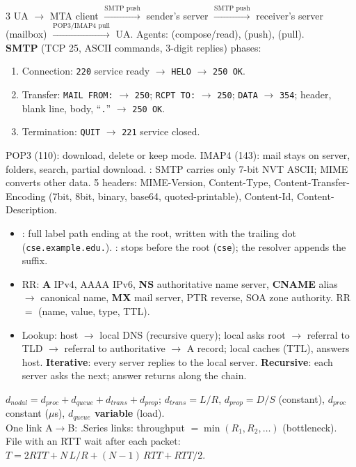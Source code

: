 \begin{multicols*}{3}
 
UA $\to$ MTA client $\xrightarrow{\text{SMTP push}}$ sender's server $\xrightarrow{\text{SMTP push}}$ receiver's server (mailbox) $\xrightarrow{\text{POP3/IMAP4 pull}}$ UA. Agents:  (compose/read),  (push),  (pull).\\
\textbf{SMTP} (TCP 25, ASCII commands, 3-digit replies) phases:
\begin{enumerate}
  \item Connection: \texttt{220} service ready $\to$ \texttt{HELO} $\to$ \texttt{250 OK}.
  \item Transfer: \texttt{MAIL FROM:} $\to$ \texttt{250}; \texttt{RCPT TO:} $\to$ \texttt{250}; \texttt{DATA} $\to$ \texttt{354}; header, blank line, body, ``\texttt{.}'' $\to$ \texttt{250 OK}.
  \item Termination: \texttt{QUIT} $\to$ \texttt{221} service closed.
\end{enumerate}
POP3 (110): download, delete or keep mode. IMAP4 (143): mail stays on server, folders, search, partial download.
: SMTP carries only 7-bit NVT ASCII; MIME converts other data. 5 headers: MIME-Version, Content-Type, Content-Transfer-Encoding (7bit, 8bit, binary, base64, quoted-printable), Content-Id, Content-Description.

 
\begin{itemize}
  \item {}: full label path ending at the root, written with the trailing dot (\texttt{cse.example.edu.}). : stops before the root (\texttt{cse}); the resolver appends the suffix.
  \item RR: \textbf{A} IPv4, AAAA IPv6, \textbf{NS} authoritative name server, \textbf{CNAME} alias $\to$ canonical name, \textbf{MX} mail server, PTR reverse, SOA zone authority. RR $=$ (name, value, type, TTL).
  \item Lookup: host $\to$ local DNS (recursive query); local asks root $\to$ referral to TLD $\to$ referral to authoritative $\to$ A record; local caches (TTL), answers host. \textbf{Iterative}: every server replies to the local server. \textbf{Recursive}: each server asks the next; answer returns along the chain.
\end{itemize}

 
$d_{nodal}=d_{proc}+d_{queue}+d_{trans}+d_{prop}$; $d_{trans}=L/R$, $d_{prop}=D/S$ (constant), $d_{proc}$ constant ($\mu$s), \textbf{$d_{queue}$ variable} (load).\\
One link A$\to$B: .\quad Series links: throughput $=\min(R_1,R_2,\dots)$ (bottleneck).\\
File with an RTT wait after each packet: $T=2RTT+N\,L/R+(N{-}1)\,RTT+RTT/2$.


\end{multicols*}
